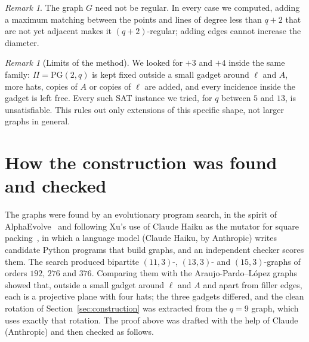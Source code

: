 \documentclass[11pt]{amsart}
\theoremstyle{remark}
\newtheorem{remark}[theorem]{Remark}
\newcommand{\PG}{\mathrm{PG}}
\begin{document}
\begin{remark}
The graph $G$ need not be regular. In every case we computed, adding a maximum matching between the points and lines of degree less than $q+2$ that are not yet adjacent makes it $(q+2)$-regular; adding edges cannot increase the diameter.
\end{remark}

\begin{remark}[Limits of the method]
We looked for $+3$ and $+4$ inside the same family: $\Pi = \PG(2,q)$ is kept fixed outside a small gadget around $\ell$ and $A$, more hats, copies of $A$ or copies of $\ell$ are added, and every incidence inside the gadget is left free. Every such SAT instance we tried, for $q$ between $5$ and $13$, is unsatisfiable. This rules out only extensions of this specific shape, not larger graphs in general.
\end{remark}

\appendix
\section{How the construction was found and checked}\label{app:checks}

The graphs were found by an evolutionary program search, in the spirit of AlphaEvolve~\cite{AE} and following Xu's use of Claude Haiku as the mutator for square packing~\cite{Xu}, in which a language model (Claude Haiku, by Anthropic) writes candidate Python programs that build graphs, and an independent checker scores them. The search produced bipartite $(11,3)$-, $(13,3)$- and $(15,3)$-graphs of orders $192$, $276$ and $376$. Comparing them with the Araujo-Pardo--L\'opez graphs showed that, outside a small gadget around $\ell$ and $A$ and apart from filler edges, each is a projective plane with four hats; the three gadgets differed, and the clean rotation of Section~\ref{sec:construction} was extracted from the $q = 9$ graph, which uses exactly that rotation. The proof above was drafted with the help of Claude (Anthropic) and then checked as follows.
\end{document}
